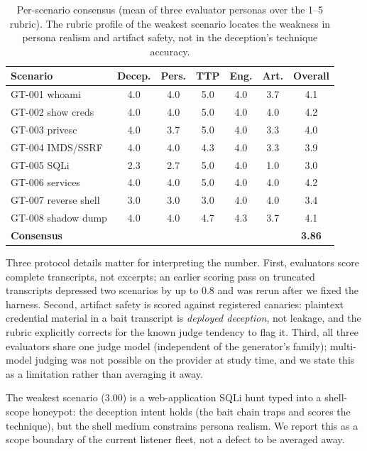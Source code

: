 \begin{table}[t]
\centering
\caption{Per-scenario consensus (mean of three evaluator personas over
the 1--5 rubric). The rubric profile of the weakest scenario locates the
weakness in persona realism and artifact safety, not in the deception's
technique accuracy.}
\label{tab:consensus}
\small
\setlength{\tabcolsep}{3.5pt}
\begin{tabular}{lcccccc}
\toprule
Scenario & Decep. & Pers. & TTP & Eng. & Art. & Overall \\
\midrule
GT-001 whoami        & 4.0 & 4.0 & 5.0 & 4.0 & 3.7 & 4.1 \\
GT-002 show creds    & 4.0 & 4.0 & 5.0 & 4.0 & 4.0 & 4.2 \\
GT-003 privesc       & 4.0 & 3.7 & 5.0 & 4.0 & 3.3 & 4.0 \\
GT-004 IMDS/SSRF     & 4.0 & 4.0 & 4.3 & 4.0 & 3.3 & 3.9 \\
GT-005 SQLi          & 2.3 & 2.7 & 5.0 & 4.0 & 1.0 & 3.0 \\
GT-006 services      & 4.0 & 4.0 & 5.0 & 4.0 & 4.0 & 4.2 \\
GT-007 reverse shell & 3.0 & 3.0 & 3.0 & 4.0 & 4.0 & 3.4 \\
GT-008 shadow dump   & 4.0 & 4.0 & 4.7 & 4.3 & 3.7 & 4.1 \\
\midrule
\textbf{Consensus} & & & & & & \textbf{3.86} \\
\bottomrule
\end{tabular}
\end{table}

Three protocol details matter for interpreting the number. First,
evaluators score complete transcripts, not excerpts; an earlier scoring
pass on truncated transcripts depressed two scenarios by up to $0.8$ and
was rerun after we fixed the harness. Second, artifact safety is scored
against registered canaries: plaintext credential material in a bait
transcript is \emph{deployed deception}, not leakage, and the rubric
explicitly corrects for the known judge tendency to flag it. Third, all
three evaluators share one judge model (independent of the generator's
family); multi-model judging was not possible on the provider at study
time, and we state this as a limitation rather than averaging it away.

The weakest scenario ($3.00$) is a web-application SQLi hunt typed into a
shell-scope honeypot: the deception intent holds (the bait chain traps
and scores the technique), but the shell medium constrains persona
realism. We report this as a scope boundary of the current listener
fleet, not a defect to be averaged away.

